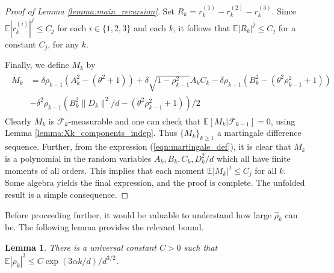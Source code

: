 \documentclass[12pt]{article}
\newtheorem{lemma}[theorem]{Lemma}      %
\def\gF{{\mathcal{F}}}
\newcommand{\E}{\mathbb{E}}
\begin{document}
\begin{proof}[Proof of Lemma \ref{lemma:main_recursion}]
Set $R_k=r_k^{(1)}-r_k^{(2)}-r_k^{(3)}$. Since $\E|r_k^{(i)}|^j\leq C_j$ for each $i\in\{1,2,3\}$ and each $k$, it follows that $\E|R_k|^j\leq C_j$ for a constant $C_j$, for any $k$.

Finally, we define $M_k$ by
\begin{align}\label{eqn:martingale_def}
\begin{split}
    M_k &= \delta\rho_{k-1}(A_k^2-(\theta^2+1))+\delta\sqrt{1-\rho^2_{k-1}}A_kC_k-\delta\rho_{k-1}(B_k^2-(\theta^2\rho_{k-1}^2+1))\\
    &-\delta^2\rho_{k-1}(B_k^2\|D_k\|^2/d-(\theta^2\rho_{k-1}^2+1))/2
\end{split}
\end{align}Clearly $M_k$ is $\gF_k$-measurable and one can check that $\E[M_k|\gF_{k-1}]=0$, using Lemma \ref{lemma:Xk_components_indep}. Thus $\{M_k\}_{k\geq 1}$ a martingale difference sequence. Further, from the expression (\ref{eqn:martingale_def}), it is clear that $M_k$ is a polynomial in the random variables $A_k,B_k,C_k,D_k^2/d$ which all have finite moments of all orders. This implies that each moment $\E|M_k|^j\leq C_j$ for all $k$. Some algebra yields the final expression, and the proof is complete. The unfolded result is a simple consequence.
\end{proof}



\medskip

Before proceeding further, it would be valuable to understand how large $\hat \rho_k$ can be. The following lemma provides the relevant bound.

\medskip

\begin{lemma}\label{lemma:uniform_bounds_rho}
    There is a universal constant $C>0$ such that $\E|\rho_k|^3\leq C\exp(3\alpha k/d)/d^{3/2}$.
\end{lemma}

\medskip
\end{document}
